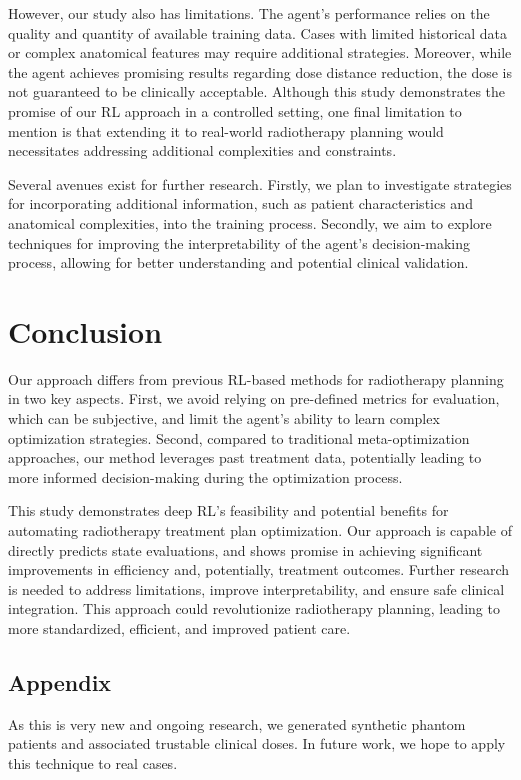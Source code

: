 However, our study also has limitations.
The agent's performance relies on the quality and quantity of available training data.
Cases with limited historical data or complex anatomical features may require additional strategies.
Moreover, while the agent achieves promising results regarding dose distance reduction, the dose is not guaranteed to be clinically acceptable.
Although this study demonstrates the promise of our RL approach in a controlled setting, one final limitation to mention is that extending it to real-world radiotherapy planning would necessitates addressing additional complexities and constraints.

Several avenues exist for further research.
Firstly, we plan to investigate strategies for incorporating additional information, such as patient characteristics and anatomical complexities, into the training process.
Secondly, we aim to explore techniques for improving the interpretability of the agent's decision-making process, allowing for better understanding and potential clinical validation.

\section{Conclusion}
Our approach differs from previous RL-based methods for radiotherapy planning in two key aspects.
First, we avoid relying on pre-defined metrics for evaluation, which can be subjective, and limit the agent's ability to learn complex optimization strategies.
Second, compared to traditional meta-optimization approaches, our method leverages past treatment data, potentially leading to more informed decision-making during the optimization process.

This study demonstrates deep RL's feasibility and potential benefits for automating radiotherapy treatment plan optimization.
Our approach is capable of directly predicts state evaluations, and shows promise in achieving significant improvements in efficiency and, potentially, treatment outcomes.
Further research is needed to address limitations, improve interpretability, and ensure safe clinical integration.
This approach could revolutionize radiotherapy planning, leading to more standardized, efficient, and improved patient care.

\subsection*{Appendix}
As this is very new and ongoing research, we generated synthetic phantom patients and associated trustable clinical doses.
In future work, we hope to apply this technique to real cases.

